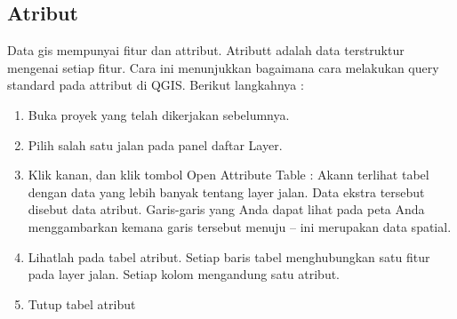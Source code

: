 \subsection{Atribut}
Data gis mempunyai fitur dan attribut. Atributt adalah data terstruktur mengenai setiap fitur. Cara ini menunjukkan bagaimana cara melakukan query standard pada attribut di QGIS.
Berikut langkahnya :
\begin{enumerate}
\item
Buka proyek yang telah dikerjakan sebelumnya.
\item
Pilih salah satu jalan pada panel daftar Layer.
\item
Klik kanan, dan klik tombol Open Attribute Table :
Akann terlihat tabel dengan data yang lebih banyak tentang layer jalan. Data ekstra tersebut disebut data atribut. Garis-garis yang Anda dapat lihat pada peta Anda menggambarkan kemana garis tersebut menuju – ini merupakan data spatial.
\item
Lihatlah pada tabel atribut. Setiap baris tabel menghubungkan satu fitur pada layer jalan. Setiap kolom mengandung satu atribut.
\item
Tutup tabel atribut
\end{enumerate}


